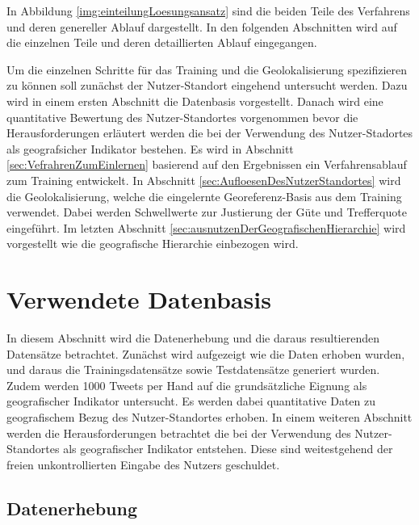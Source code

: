 		In Abbildung \ref{img:einteilungLoesungsansatz} sind die beiden Teile des Verfahrens und deren genereller Ablauf dargestellt.
		In den folgenden Abschnitten wird auf die einzelnen Teile und deren detaillierten Ablauf eingegangen. 
		
		Um die einzelnen Schritte für das Training und die Geolokalisierung spezifizieren zu können soll zunächst der Nutzer-Standort eingehend untersucht werden.
		Dazu wird in einem ersten Abschnitt die Datenbasis vorgestellt.
		Danach wird eine quantitative Bewertung des Nutzer-Standortes vorgenommen bevor die Herausforderungen erläutert werden die bei der Verwendung des Nutzer-Stadortes als geografsicher Indikator bestehen.
		Es wird in Abschnitt \ref{sec:VefrahrenZumEinlernen} basierend auf den Ergebnissen ein Verfahrensablauf zum Training entwickelt. 
		In Abschnitt \ref{sec:AufloesenDesNutzerStandortes} wird die Geolokalisierung, welche die eingelernte Georeferenz-Basis aus dem Training verwendet.
		Dabei werden Schwellwerte zur Justierung der Güte und Trefferquote eingeführt.
		Im letzten Abschnitt \ref{sec:ausnutzenDerGeografischenHierarchie} wird vorgestellt wie die geografische Hierarchie einbezogen wird.


	\section{Verwendete Datenbasis}

		In diesem Abschnitt wird die Datenerhebung und die daraus resultierenden Datensätze betrachtet.
		Zunächst wird aufgezeigt wie die Daten erhoben wurden, und daraus die Trainingsdatensätze sowie Testdatensätze generiert wurden.
		Zudem werden 1000 Tweets per Hand auf die grundsätzliche Eignung als geografischer Indikator untersucht.
		Es werden dabei quantitative Daten zu geografischem Bezug des Nutzer-Standortes erhoben.
		In einem weiteren Abschnitt werden die Herausforderungen betrachtet die bei der Verwendung des Nutzer-Standortes als geografischer Indikator entstehen. 
		Diese sind weitestgehend der freien unkontrollierten Eingabe des Nutzers geschuldet.

		\subsection{Datenerhebung} 

